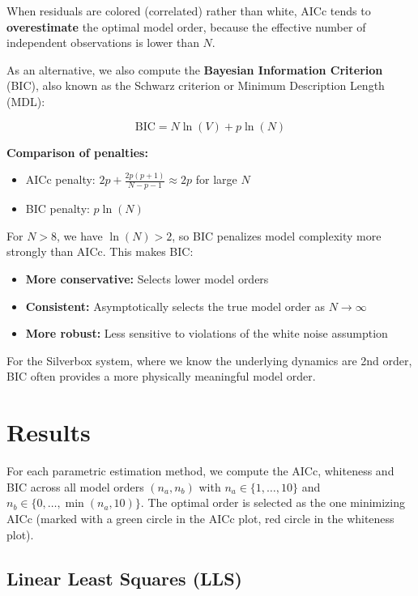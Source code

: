 When residuals are colored (correlated) rather than white, AICc tends to \textbf{overestimate} the optimal model order, because the effective number of independent observations is lower than $N$.

As an alternative, we also compute the \textbf{Bayesian Information Criterion} (BIC), also known as the Schwarz criterion or Minimum Description Length (MDL):

\begin{equation}
    \text{BIC} = N \ln(V) + p \ln(N)
\end{equation}

\textbf{Comparison of penalties:}
\begin{itemize}
    \item AICc penalty: $2p + \frac{2p(p+1)}{N-p-1} \approx 2p$ for large $N$
    \item BIC penalty: $p \ln(N)$
\end{itemize}

For $N > 8$, we have $\ln(N) > 2$, so BIC penalizes model complexity more strongly than AICc. This makes BIC:
\begin{itemize}
    \item \textbf{More conservative:} Selects lower model orders
    \item \textbf{Consistent:} Asymptotically selects the true model order as $N \to \infty$
    \item \textbf{More robust:} Less sensitive to violations of the white noise assumption
\end{itemize}

For the Silverbox system, where we know the underlying dynamics are 2nd order, BIC often provides a more physically meaningful model order.

\section{Results}

For each parametric estimation method, we compute the AICc, whiteness and BIC across all model orders $(n_a, n_b)$ with $n_a \in \{1, \ldots, 10\}$ and $n_b \in \{0, \ldots, \min(n_a, 10)\}$. The optimal order is selected as the one minimizing AICc (marked with a green circle in the AICc plot, red circle in the whiteness plot).

\subsection{Linear Least Squares (LLS)}

